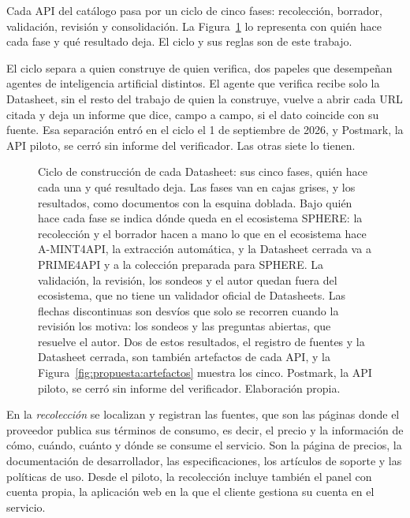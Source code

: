 Cada API del catálogo pasa por un ciclo de cinco fases: recolección, borrador, validación,
revisión y consolidación.
La Figura~\ref{fig:propuesta:ciclo} lo representa con quién hace cada fase y qué resultado deja.
El ciclo y sus reglas son de este trabajo.

El ciclo separa a quien construye de quien verifica, dos papeles que desempeñan agentes de inteligencia artificial distintos.
El agente que verifica recibe solo la Datasheet, sin el resto del trabajo de quien la construye, vuelve a abrir cada URL citada y deja un informe que dice, campo a campo, si el dato coincide con su fuente.
Esa separación entró en el ciclo el 1 de septiembre de 2026, y Postmark, la API piloto, se cerró sin informe del verificador.
Las otras siete lo tienen.

\begin{figure}[tbp]
\centering

\caption[Ciclo de construcción de cada Datasheet]{Ciclo de construcción de cada Datasheet: sus cinco fases, quién hace cada una y qué resultado deja. Las fases van en cajas grises, y los resultados, como documentos con la esquina doblada. Bajo quién hace cada fase se indica dónde queda en el ecosistema SPHERE: la recolección y el borrador hacen a mano lo que en el ecosistema hace A-MINT4API, la extracción automática, y la Datasheet cerrada va a PRIME4API y a la colección preparada para SPHERE. La validación, la revisión, los sondeos y el autor quedan fuera del ecosistema, que no tiene un validador oficial de Datasheets. Las flechas discontinuas son desvíos que solo se recorren cuando la revisión los motiva: los sondeos y las preguntas abiertas, que resuelve el autor. Dos de estos resultados, el registro de fuentes y la Datasheet cerrada, son también artefactos de cada API, y la Figura~\ref{fig:propuesta:artefactos} muestra los cinco. Postmark, la API piloto, se cerró sin informe del verificador. Elaboración propia.}
\label{fig:propuesta:ciclo}
\end{figure}

En la \textit{recolección} se localizan y registran las fuentes, que son las páginas donde el proveedor publica sus términos de consumo, es decir, el precio y la información de cómo, cuándo, cuánto y dónde se consume el servicio.
Son la página de precios, la documentación de desarrollador, las especificaciones, los artículos de soporte y las políticas de uso.
Desde el piloto, la recolección incluye también el panel con cuenta propia, la aplicación web en la que el cliente gestiona su cuenta en el servicio.

